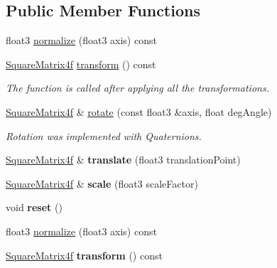 \subsection*{Public Member Functions}
\begin{DoxyCompactItemize}
\item 
float3 \hyperlink{class_mesh_transformation_a62b90b65ce289707982efdb23a88e517}{normalize} (float3 axis) const
\item 
\hyperlink{class_square_matrix4}{Square\+Matrix4f} \hyperlink{class_mesh_transformation_afd48394eed82a85ca29d05cd4817c29e}{transform} () const\hypertarget{class_mesh_transformation_afd48394eed82a85ca29d05cd4817c29e}{}\label{class_mesh_transformation_afd48394eed82a85ca29d05cd4817c29e}

\begin{DoxyCompactList}\small\item\em The function is called after applying all the transformations. \end{DoxyCompactList}\item 
\hyperlink{class_square_matrix4}{Square\+Matrix4f} \& \hyperlink{class_mesh_transformation_ad14a09457c8d103682183cd8e13b78dc}{rotate} (const float3 \&axis, float deg\+Angle)\hypertarget{class_mesh_transformation_ad14a09457c8d103682183cd8e13b78dc}{}\label{class_mesh_transformation_ad14a09457c8d103682183cd8e13b78dc}

\begin{DoxyCompactList}\small\item\em Rotation was implemented with Quaternions. \end{DoxyCompactList}\item 
\hyperlink{class_square_matrix4}{Square\+Matrix4f} \& {\bfseries translate} (float3 translation\+Point)\hypertarget{class_mesh_transformation_a07eeec7706eaf9e90aaa486664b2632c}{}\label{class_mesh_transformation_a07eeec7706eaf9e90aaa486664b2632c}

\item 
\hyperlink{class_square_matrix4}{Square\+Matrix4f} \& {\bfseries scale} (float3 scale\+Factor)\hypertarget{class_mesh_transformation_ab8dbdbdcaa5e40a7aa234d076b351971}{}\label{class_mesh_transformation_ab8dbdbdcaa5e40a7aa234d076b351971}

\item 
void {\bfseries reset} ()\hypertarget{class_mesh_transformation_a86b8191ff85c6a34e880dcfb582960ca}{}\label{class_mesh_transformation_a86b8191ff85c6a34e880dcfb582960ca}

\item 
float3 \hyperlink{class_mesh_transformation_a62b90b65ce289707982efdb23a88e517}{normalize} (float3 axis) const
\item 
\hyperlink{class_square_matrix4}{Square\+Matrix4f} {\bfseries transform} () const\hypertarget{class_mesh_transformation_afd48394eed82a85ca29d05cd4817c29e}{}\label{class_mesh_transformation_afd48394eed82a85ca29d05cd4817c29e}


\end{DoxyCompactItemize}
